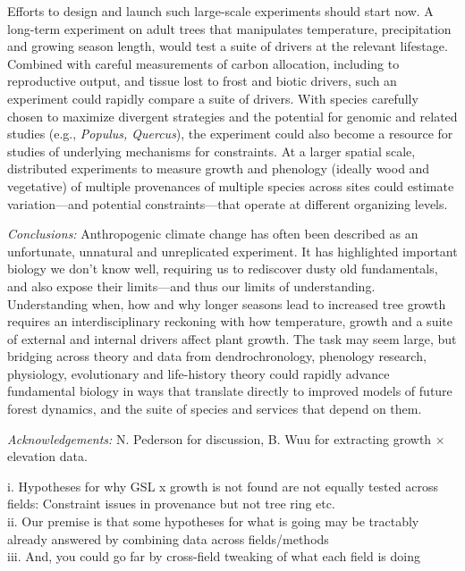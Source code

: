 \documentclass[11pt]{article}
\begin{document}
Efforts to design and launch such large-scale experiments should start now. A long-term experiment on adult trees that manipulates temperature, precipitation and growing season length, would test a suite of drivers at the relevant lifestage. Combined with careful measurements of carbon allocation, including to reproductive output, and tissue lost to frost and biotic drivers, such an experiment could rapidly compare a suite of drivers. With species carefully chosen to maximize divergent strategies and the potential for genomic and related studies (e.g., \emph{Populus, Quercus}), the experiment could also become a resource for studies of underlying mechanisms for constraints. At a larger spatial scale, distributed experiments to measure growth and phenology (ideally wood and vegetative) of multiple provenances of multiple species across sites could estimate variation---and potential constraints---that operate at different organizing levels. 

\emph{Conclusions:}
Anthropogenic climate change has often been described as an unfortunate, unnatural and unreplicated experiment. It has highlighted important biology we don't know well, requiring us to rediscover dusty old fundamentals, and also expose their limits---and thus our limits of understanding. Understanding when, how and why longer seasons lead to increased tree growth requires an interdisciplinary reckoning with how temperature, growth and a suite of external and internal drivers affect plant growth. The task may seem large, but bridging across theory and data from dendrochronology, phenology research, physiology, evolutionary and life-history theory could rapidly advance fundamental biology in ways that translate directly to improved models of future forest dynamics, and the suite of species and services that depend on them. %

\emph{Acknowledgements:} N. Pederson for discussion, B. Wuu for extracting growth $\times$ elevation data. 

\iffalse

i. Hypotheses for why GSL x growth is not found are not equally tested across fields: Constraint issues in provenance but not tree ring etc.\\
ii. Our premise is that some hypotheses for what is going may be tractably already answered by combining data across fields/methods\\
iii. And, you could go far by cross-field tweaking of what each field is doing
\end{document}
